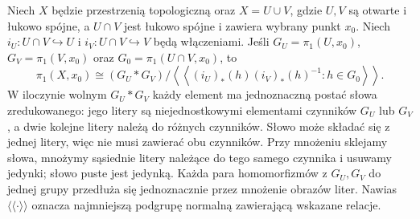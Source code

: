 \begin{twierdzenie}
\label{thm:van-kampen}
Niech $X$ będzie przestrzenią topologiczną
oraz $X=U\cup V$, gdzie $U,V$ są otwarte
i łukowo spójne, a $U\cap V$ jest łukowo
spójne i zawiera wybrany punkt $x_0$.
Niech $i_U:U\cap V\hookrightarrow U$ i
$i_V:U\cap V\hookrightarrow V$ będą włączeniami.
Jeśli $G_U=\pi_1(U,x_0)$, $G_V=\pi_1(V,x_0)$
oraz $G_0=\pi_1(U\cap V,x_0)$, to
\[
 \pi_1(X,x_0)\cong
 (G_U*G_V)/
 \left\langle\!\left\langle
 (i_U)_*(h)(i_V)_*(h)^{-1}:h\in G_0
 \right\rangle\!\right\rangle.
\]
W iloczynie wolnym $G_U*G_V$ każdy element ma jednoznaczną
postać słowa zredukowanego: jego litery są niejednostkowymi
elementami czynników $G_U$ lub $G_V$, a dwie kolejne litery
należą do różnych czynników. Słowo może składać się
z jednej litery, więc nie musi zawierać obu czynników. Przy mnożeniu sklejamy słowa,
mnożymy sąsiednie litery należące do tego samego czynnika i usuwamy
jedynki; słowo puste jest jedynką. Każda para homomorfizmów
z $G_U,G_V$ do jednej grupy przedłuża się jednoznacznie przez
mnożenie obrazów liter. Nawias
$\langle\!\langle\cdot\rangle\!\rangle$
oznacza najmniejszą podgrupę normalną
zawierającą wskazane relacje.
\end{twierdzenie}
